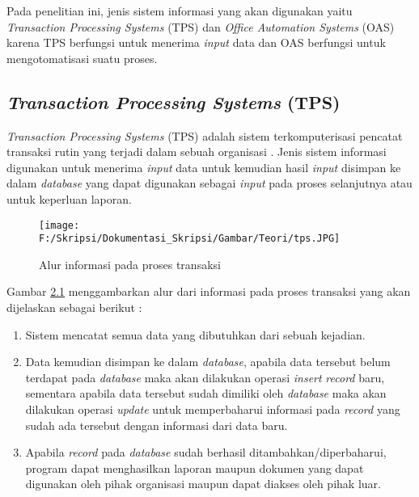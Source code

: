 	Pada penelitian ini, jenis sistem informasi yang akan digunakan yaitu \textit{Transaction Processing Systems} (TPS) dan \textit{Office Automation Systems} (OAS) karena TPS berfungsi untuk menerima \textit{input} data dan OAS berfungsi untuk mengotomatisasi suatu proses.

\subsection{\textit{Transaction Processing Systems} (TPS)}
\label{sec:tps}
\textit{Transaction Processing Systems} (TPS) adalah sistem terkomputerisasi pencatat transaksi rutin yang terjadi dalam sebuah organisasi \cite{Laudon:1996}. Jenis sistem informasi digunakan untuk menerima \textit{input} data untuk kemudian hasil \textit{input} disimpan ke dalam \textit{database} yang dapat digunakan sebagai \textit{input} pada proses selanjutnya atau untuk keperluan laporan.

\begin{figure}[H]
	\centering
		\texttt{[image: F:/Skripsi/Dokumentasi\_Skripsi/Gambar/Teori/tps.JPG]}
		{\caption{Alur informasi pada proses transaksi} \cite{Turban:2001}}
	\label{fig:tps}
\end{figure}

Gambar \hyperlink{tps}{2.1} menggambarkan alur dari informasi pada proses transaksi yang akan dijelaskan sebagai berikut : 
\begin{enumerate}
	\item Sistem mencatat semua data yang dibutuhkan dari sebuah kejadian.
	\item Data kemudian disimpan ke dalam \textit{database}, apabila data tersebut belum terdapat pada \textit{database} maka akan dilakukan operasi \textit{insert} \textit{record} baru, sementara apabila data tersebut sudah dimiliki oleh \textit{database} maka akan dilakukan operasi \textit{update} untuk memperbaharui informasi pada \textit{record} yang sudah ada tersebut dengan informasi dari data baru.
	\item Apabila \textit{record} pada \textit{database} sudah berhasil ditambahkan/diperbaharui, program dapat menghasilkan laporan maupun dokumen yang dapat digunakan oleh pihak organisasi maupun dapat diakses oleh pihak luar.
\end{enumerate}

